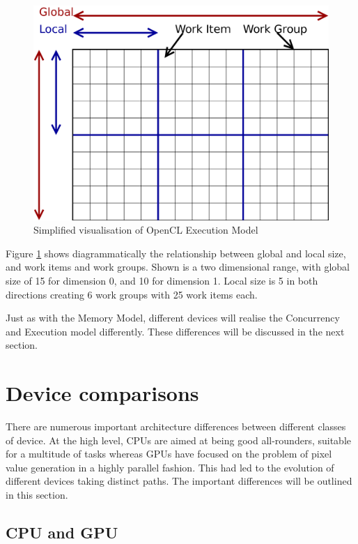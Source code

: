 \begin{figure}
\includegraphics[width=\linewidth]{images/openCLExecutionModel.png}
\caption{Simplified visualisation of OpenCL Execution Model}
\label{fig:openCLExecutionModel}
\end{figure}

Figure \ref{fig:openCLExecutionModel} shows diagrammatically the relationship
between global and local size, and work items and work groups. Shown is a two
dimensional range, with global size of 15 for dimension 0, and 10 for dimension
1. Local size is 5 in both directions creating 6 work groups with 25 work items
each.

Just as with the Memory Model, different devices will realise the Concurrency
and Execution model differently. These differences will be discussed in the next
section.

\section{Device comparisons}

There are numerous important architecture differences between different classes
of device. At the high level, CPUs are aimed at being good all-rounders,
suitable for a multitude of tasks whereas GPUs have focused on the problem of
pixel value generation in a highly parallel fashion. This had led to the
evolution of different devices taking distinct paths. The important differences
will be outlined in this section.

\subsection{CPU and GPU}

